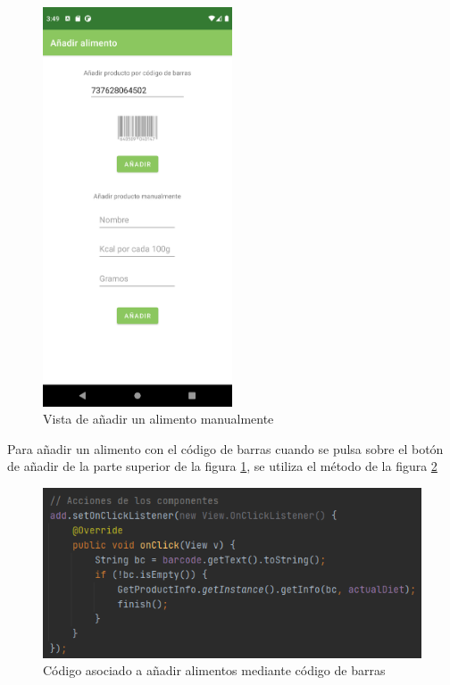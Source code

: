 \begin{figure}[H]
    \centering
    \includegraphics[width=0.5\textwidth]{Images/Capitulo7/manual.png}
        \caption{Vista de añadir un alimento manualmente}
    \label{fig:manual}
\end{figure}

Para añadir un alimento con el código de barras cuando se pulsa sobre el botón de añadir de la parte superior de la figura \ref{fig:manual}, se utiliza el método de la figura \ref{fig:barcode}
\begin{figure}[H]
    \centering
    \includegraphics[width=\textwidth]{Images/Capitulo7/barcode.png}
        \caption{Código asociado a añadir alimentos mediante código de barras}
    \label{fig:barcode}
\end{figure}

